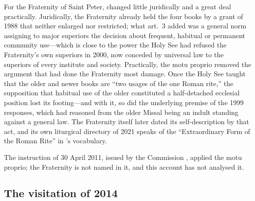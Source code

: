 For the Fraternity of Saint Peter,  changed
little juridically and a great deal practically. Juridically, the
Fraternity already held the four books by a grant of 1988 that
 neither enlarged nor restricted; what art.~3
added was a general norm assigning to major superiors the decision about
frequent, habitual or permanent community use---which is close to the
power the Holy See had refused the Fraternity's own superiors in 2000,
now conceded by universal law to the superiors of every institute and
society. Practically, the motu proprio removed the argument that had done
the Fraternity most damage. Once the
Holy See taught that the older and newer books are ``two usages of the one
Roman rite,'' the supposition that habitual use of the older constituted a
half-detached ecclesial position lost its footing---and with it, so did
the underlying premise of the 1999 responses, which had reasoned from the
older Missal being an indult standing against a general law. The
Fraternity itself later dated its self-description by that act, and its
own liturgical directory of 2021 speaks of the ``Extraordinary Form of the
Roman Rite'' in 's
vocabulary.

The instruction  of 30 April 2011, issued by
the Commission , applied the motu proprio; the
Fraternity is not named in it, and this account has not analysed
it.

\subsection{The visitation of 2014}

